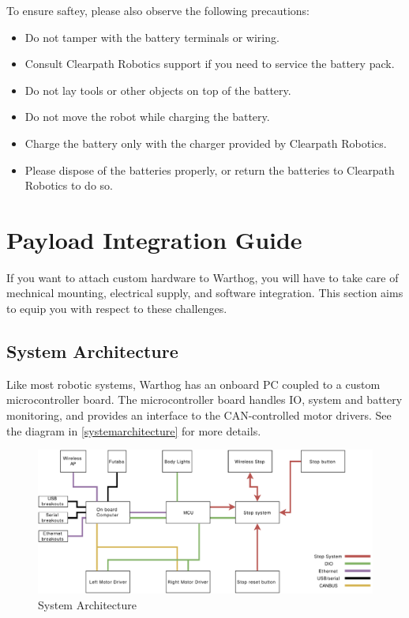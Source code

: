 \documentclass[]{clearpath-latex/clearpath-manual}
\begin{document}
To ensure saftey, please also observe the following precautions:

\begin{itemize}[nolistsep]
  \item Do not tamper with the battery terminals or wiring.
  \item Consult Clearpath Robotics support if you need to service the battery pack.
  \item Do not lay tools or other objects on top of the battery.
  \item Do not move the robot while charging the battery.
  \item Charge the battery only with the charger provided by Clearpath Robotics.
  \item Please dispose of the batteries properly, or return the batteries to Clearpath Robotics to do so.
\end{itemize}


\section{Payload Integration Guide}

If you want to attach custom hardware to Warthog, you will have to take care of mechnical mounting, electrical supply, and software integration.  This section aims to equip you with respect to these challenges.

\subsection{System Architecture}

Like most robotic systems, Warthog has an onboard PC coupled to a custom microcontroller board. The microcontroller board handles IO, system and battery monitoring, and provides an interface to the CAN-controlled motor drivers. See the diagram in \autoref{systemarchitecture} for more details.

\begin{figure}[!htb]
  \centering
  \includegraphics[width=1.0\linewidth]{warthog-logic-conn.pdf}
  \caption{System Architecture}
  \label{systemarchitecture}
\end{figure}
\end{document}
